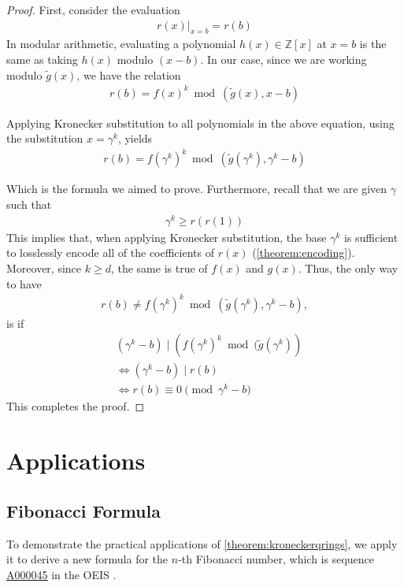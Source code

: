 \documentclass[12pt,reqno]{article}
\theoremstyle{plain}
\theoremstyle{definition}
\newcommand{\eval}[2]{\left . #1 \right|_{#2}}
\newcommand{\seqnum}[1]{\href{https://oeis.org/#1}{\rm \underline{#1}}}
\begin{document}
\begin{proof}
First, consider the evaluation 
\begin{align*}
    \eval{r(x)}{x=b} = r(b)
\end{align*}
In modular arithmetic, evaluating a polynomial $h(x) \in \mathbb{Z}[x]$ at $x=b$ is the same as taking $h(x)$ modulo $(x - b)$. In our case, since we are working modulo $\tilde{g}(x)$, we have the relation
\begin{align*}
    r(b) = f(x)^k \bmod{(\tilde{g}(x), x - b)}
\end{align*}

Applying Kronecker substitution to all polynomials in the above equation, using the substitution $x = \gamma^k$, yields
\begin{align*}
    r(b) = f(\gamma^k)^k \bmod{(\tilde{g}(\gamma^k), \gamma^k - b)}
\end{align*}

Which is the formula we aimed to prove. Furthermore, recall that we are given $\gamma$ such that
\begin{align*}
    \gamma^k \geq r(r(1))
\end{align*}
This implies that, when applying Kronecker substitution, the base $\gamma^k$ is sufficient to losslessly encode all of the coefficients of $r(x)$ (\cref{theorem:encoding}). Moreover, since $k \geq d$, the same is true of $f(x)$ and $g(x)$. Thus, the only way to have
\begin{align}
    r(b) \not= f(\gamma^k)^k \bmod{(\tilde{g}(\gamma^k), \gamma^k - b)} ,
\end{align}
is if
\begin{align*}
    & (\gamma^k - b) \mid (f(\gamma^k)^k \bmod{(\tilde{g}(\gamma^k)}) \\
    & \Longleftrightarrow (\gamma^k - b) \mid r(b) \\
    & \Longleftrightarrow r(b) \equiv 0 \pmod{\gamma^k - b}
\end{align*}
This completes the proof.
\end{proof}

\section{Applications} \label{section:applications}

\subsection{Fibonacci Formula}
To demonstrate the practical applications of \cref{theorem:kroneckerqrings}, we apply it to derive a new formula for the $n$-th Fibonacci number, which is sequence \seqnum{A000045} in the OEIS \cite{A000045}.
\end{document}
